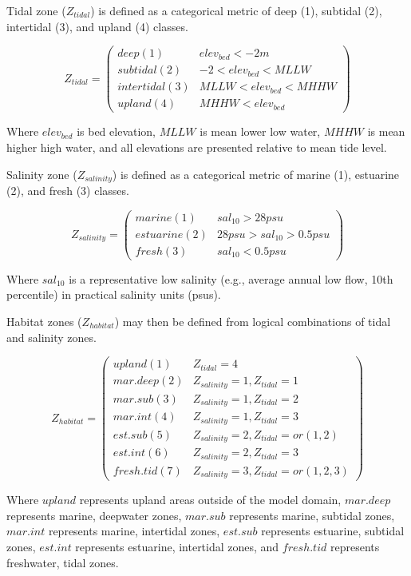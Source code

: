 \documentclass[
]{book}
\begin{document}
Tidal zone (\(Z_{tidal}\)) is defined as a categorical metric of deep (1), subtidal (2), intertidal (3), and upland (4) classes.

\[Z_{tidal} = \begin{pmatrix} deep(1) & elev_{bed} < -2m\\
subtidal(2) & -2<elev_{bed}<MLLW\\
intertidal(3) & MLLW<elev_{bed}<MHHW\\
upland(4) & MHHW<elev_{bed}
\end{pmatrix}\]

Where \(elev_{bed}\) is bed elevation, \(MLLW\) is mean lower low water, \(MHHW\) is mean higher high water, and all elevations are presented relative to mean tide level.

Salinity zone (\(Z_{salinity}\)) is defined as a categorical metric of marine (1), estuarine (2), and fresh (3) classes.

\[Z_{salinity} = \begin{pmatrix} marine(1) & sal_{10}>28psu\\
estuarine(2) & 28psu>sal_{10}>0.5psu\\
fresh(3) & sal_{10}<0.5psu
\end{pmatrix}\]

Where \(sal_{10}\) is a representative low salinity (e.g., average annual low flow, 10th percentile) in practical salinity units (psus).

Habitat zones (\(Z_{habitat}\)) may then be defined from logical combinations of tidal and salinity zones.

\[Z_{habitat} = \begin{pmatrix} upland(1) & Z_{tidal}=4\\
mar.deep(2) & Z_{salinity}=1,Z_{tidal}=1\\
mar.sub(3) & Z_{salinity}=1,Z_{tidal}=2\\
mar.int(4) & Z_{salinity}=1,Z_{tidal}=3\\
est.sub(5) & Z_{salinity}=2,Z_{tidal}=or(1,2)\\
est.int(6) & Z_{salinity}=2,Z_{tidal}=3\\
fresh.tid(7) & Z_{salinity}=3,Z_{tidal}=or(1,2,3)
\end{pmatrix}\]

Where \(upland\) represents upland areas outside of the model domain, \(mar.deep\) represents marine, deepwater zones, \(mar.sub\) represents marine, subtidal zones, \(mar.int\) represents marine, intertidal zones, \(est.sub\) represents estuarine, subtidal zones, \(est.int\) represents estuarine, intertidal zones, and \(fresh.tid\) represents freshwater, tidal zones.
\end{document}
